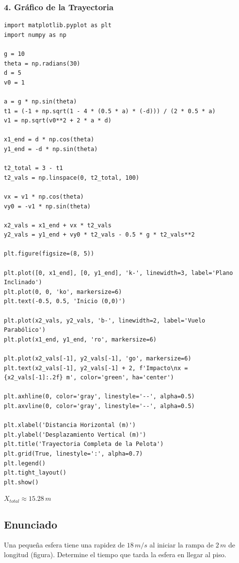 \documentclass[12pt, a4paper]{article}
\begin{document}
\subsubsection*{4. Gráfico de la Trayectoria}
\begin{verbatim}
import matplotlib.pyplot as plt
import numpy as np

g = 10
theta = np.radians(30)
d = 5
v0 = 1

a = g * np.sin(theta)
t1 = (-1 + np.sqrt(1 - 4 * (0.5 * a) * (-d))) / (2 * 0.5 * a)
v1 = np.sqrt(v0**2 + 2 * a * d)

x1_end = d * np.cos(theta)
y1_end = -d * np.sin(theta)

t2_total = 3 - t1
t2_vals = np.linspace(0, t2_total, 100)

vx = v1 * np.cos(theta)
vy0 = -v1 * np.sin(theta)

x2_vals = x1_end + vx * t2_vals
y2_vals = y1_end + vy0 * t2_vals - 0.5 * g * t2_vals**2

plt.figure(figsize=(8, 5))

plt.plot([0, x1_end], [0, y1_end], 'k-', linewidth=3, label='Plano Inclinado')
plt.plot(0, 0, 'ko', markersize=6)
plt.text(-0.5, 0.5, 'Inicio (0,0)')

plt.plot(x2_vals, y2_vals, 'b-', linewidth=2, label='Vuelo Parabólico')
plt.plot(x1_end, y1_end, 'ro', markersize=6)

plt.plot(x2_vals[-1], y2_vals[-1], 'go', markersize=6)
plt.text(x2_vals[-1], y2_vals[-1] + 2, f'Impacto\nx = {x2_vals[-1]:.2f} m', color='green', ha='center')

plt.axhline(0, color='gray', linestyle='--', alpha=0.5)
plt.axvline(0, color='gray', linestyle='--', alpha=0.5)

plt.xlabel('Distancia Horizontal (m)')
plt.ylabel('Desplazamiento Vertical (m)')
plt.title('Trayectoria Completa de la Pelota')
plt.grid(True, linestyle=':', alpha=0.7)
plt.legend()
plt.tight_layout()
plt.show()
\end{verbatim}

\begin{tcolorbox}[colback=green!5!white, colframe=green!50!black, title=Respuesta Final]
\centering \Large $X_{total} \approx 15.28 \, \si{m}$
\end{tcolorbox}

\newpage

\subsection*{Enunciado}
Una pequeña esfera tiene una rapidez de $18 \, \si{m/s}$ al iniciar la rampa de $2 \, \si{m}$ de longitud (figura). Determine el tiempo que tarda la esfera en llegar al piso. 
\end{document}
